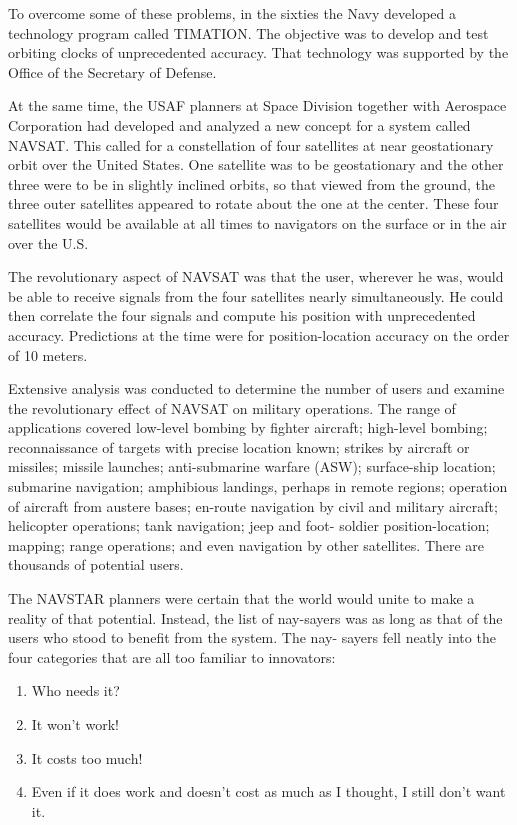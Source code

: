 To overcome some of these problems, in the sixties the Navy developed a technology program called TIMATION. The objective was to develop and test orbiting clocks of unprecedented accuracy. That technology was supported by the Office of the Secretary of Defense.

At the same time, the USAF planners at Space Division together with Aerospace Corporation had developed and analyzed a new concept for a system called NAVSAT. This called for a constellation of four satellites at near geostationary orbit over the United States. One satellite was to be geostationary and the other three were to be in slightly inclined orbits, so that viewed from the ground, the three outer satellites appeared to rotate about the one at the center. These four satellites would be available at all times to navigators on the surface or in the air over the U.S.

The revolutionary aspect of NAVSAT was that the user, wherever he was, would be able to receive signals from the four satellites nearly simultaneously. He could then correlate the four signals and compute his position with unprecedented accuracy. Predictions at the time were for position-location accuracy on the order of 10 meters.

Extensive analysis was conducted to determine the number of users and examine the revolutionary effect of NAVSAT on military operations. The range of applications covered low-level bombing by fighter aircraft; high-level bombing; reconnaissance of targets with precise location known; strikes by aircraft or missiles; missile launches; anti-submarine warfare (ASW); surface-ship location; submarine navigation; amphibious landings, perhaps in remote regions; operation of aircraft from austere bases; en-route navigation by civil and military aircraft; helicopter operations; tank navigation; jeep and foot- soldier position-location; mapping; range operations; and even navigation by other satellites. There are thousands of potential users.

The NAVSTAR planners were certain that the world would unite to make a reality of that potential. Instead, the list of nay-sayers was as long as that of the users who stood to benefit from the system. The nay- sayers fell neatly into the four categories that are all too familiar to innovators:

\begin{enumerate}
    \item Who needs it?
    \item It won't work!
    \item It costs too much!
    \item Even if it does work and doesn't cost as much as I thought, I still don't want it.
\end{enumerate}

